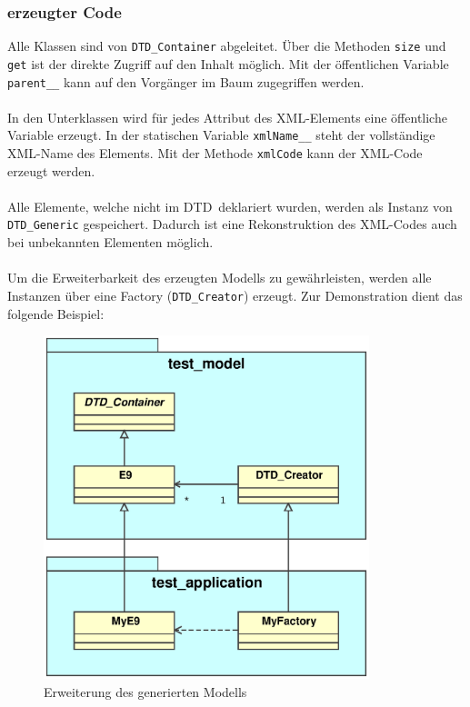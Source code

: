 \documentclass [a4paper,12pt] {scrartcl}
\newcommand{\DTD}{{\sffamily\small DTD}}
\newcommand{\XML}{{\sffamily\small XML}}
\begin{document}
\subsubsection{erzeugter Code}
Alle Klassen sind von \texttt{DTD\_Container} abgeleitet. {\"U}ber die Methoden \texttt{size}
und \texttt{get} ist der direkte Zugriff auf den Inhalt m{\"o}glich. Mit der {\"o}ffentlichen
Variable \texttt{parent\_\_} kann auf den Vorg{\"a}nger im Baum zugegriffen werden.\\
~\\
In den Unterklassen wird f{\"u}r jedes Attribut des \XML-Elements eine {\"o}ffentliche Variable
erzeugt. In der statischen Variable \texttt{xmlName\_\_} steht der vollst{\"a}ndige \XML-Name
des Elements. Mit der Methode \texttt{xmlCode} kann der \XML-Code erzeugt werden.\\
~\\
Alle Elemente, welche nicht im \DTD\ deklariert wurden, werden als Instanz von
\texttt{DTD\_Generic} gespeichert. Dadurch ist eine Rekonstruktion des \XML-Codes
auch bei unbekannten Elementen m{\"o}glich.\\
~\\
Um die Erweiterbarkeit des erzeugten Modells zu gew{\"a}hrleisten, werden alle Instanzen
{\"u}ber eine Factory (\texttt{DTD\_Creator}) erzeugt. Zur Demonstration dient das folgende Beispiel:\\
\begin{figure}[ht!]
\centerline{\includegraphics[height=10cm]{dtd1.eps}}
\caption{Erweiterung des generierten Modells}
\label{fig:dtd2java-dtd1}
\end{figure}
~\\
\end{document}
